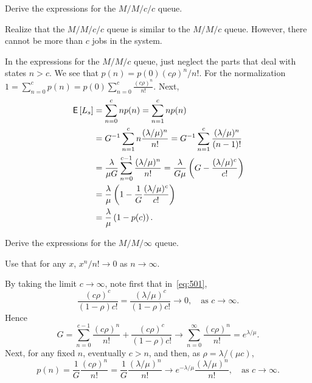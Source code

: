 \begin{exercise}\label{ex:l-245}
Derive the expressions for the $M/M/c/c$ queue.
\begin{hint}
  Realize that the $M/M/c/c$ queue is similar to the $M/M/c$ queue. However, there cannot be more than $c$ jobs in the system.
\end{hint}
\begin{solution}
In the expressions for the $M/M/c$ queue, just neglect the parts that deal with states $n>c$.
We see that $p(n) = p(0)(c\rho)^n/{n!}$. For the normalization
$1=\sum_{n=0}^c p(n) = p(0) \sum_{n=0}^c \frac{(c\rho)^n}{n!}$. Next,
 \begin{align*}
 \,\mathsf{E}\left[L_s\right]
&= \sum_{n=0}^{c} n p(n) = \sum_{n=1}^c n p(n) \\
&= G^{-1} \sum_{n=1}^c n \frac{(\lambda/\mu)^n}{n!}
= G^{-1} \sum_{n=1}^{c} \frac{(\lambda/\mu)^{n}}{(n-1)!} \\
&= \frac{\lambda}{\mu G} \sum_{n=0}^{c-1} \frac{(\lambda/\mu)^{n}}{n!}
= \frac{\lambda}{G\mu} \left(G- \frac{(\lambda/\mu)^c}{c!}\right) \\
&= \frac{\lambda}{\mu} \left(1- \frac{1}G\frac{(\lambda/\mu)^c}{c!}\right) \\
&= \frac{\lambda}{\mu} \left(1- p(c)\right).
 \end{align*}
\end{solution}
\end{exercise}

\begin{exercise}\label{ex:l-246}
Derive the expressions for the $M/M/\infty$ queue.
\begin{hint}
Use that for any $x$, $x^n/n!\to 0$ as $n\to\infty$.
\end{hint}
\begin{solution}
 By taking the limit $c\to\infty$, note first that in~\cref{eq:501},
\begin{equation*}
\frac{(c\rho)^c}{(1-\rho)c!} = \frac{(\lambda/\mu)^c}{(1-\rho)c!}\to 0, \quad\text{as } c\to \infty.
\end{equation*}
Hence
\begin{equation*}
G =\sum_{n=0}^{c-1} \frac{(c\rho)^n}{n!} + \frac{(c\rho)^c}{(1-\rho)c!} \to \sum_{n=0}^{\infty} \frac{(c\rho)^n}{n!} = e^{\lambda/\mu}.
\end{equation*}
Next, for any fixed $n$, eventually $c>n$, and then, as $\rho=\lambda/(\mu c)$,
\begin{equation*}
 p(n) = \frac{1}G \frac{(c\rho)^n}{n!} = \frac{1}G \frac{(\lambda/\mu)^n}{n!}
\to e^{-\lambda/\mu} \frac{(\lambda/\mu)^n}{n!}, \quad\text{as } c\to\infty.
\end{equation*}
\end{solution}
\end{exercise}





